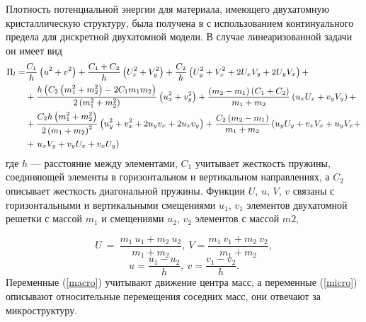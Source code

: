 Плотность потенциальной энергии для материала, имеющего двухатомную кристаллическую структуру, была получена в \cite{bound_porsp17} с использованием континуального предела для дискретной двухатомной модели. В случае линеаризованной задачи он имеет вид
\begin{equation}
\begin{small} 
	\begin{aligned}
		\Pi_l = & \frac{C_1}{h} \left(u^2 + v^2\right) + \frac{C_1+C_2}{h}\left(U_x^2+V_y^2\right) +\frac{C_2}{h}\left(U_y^2 + V_x^2 + 2U_x V_y + 2 U_y V_x\right) + \\ 
		& + \frac{h\left(C_2\left(m_1^2 + m_2^2\right) - 2C_1 m_1 m_2\right)}{2\left(m_1^2 + m_2^2\right)}\left(u_x^2 + v_y^2\right) + \frac{\left(m_2-m_1\right)\left(C_1+C_2\right)}{m_1+m_2}\left(u_x U_x + v_y V_y\right) + \\ 
		& + \frac{C_2 h\left(m_1^2+m_2^2\right)}{2\left(m_1+m_2\right)^2}\left(u_y^2+v_x^2+2u_y v_x + 2u_x v_y\right) + \frac{C_2\left(m_2 - m_1\right)}{m_1 + m_2}\left(u_y U_y+v_x V_x + u_y V_x + \right. \\
		& + \left. u_x V_y + v_y U_x + v_x U_y\right)
	\end{aligned}
\end{small}
\end{equation}
где $h$ --- расстояние между элементами, $C_1$ учитывает жесткость пружины, соединяющей элементы в горизонтальном и вертикальном направлениях, а $C_2$ описывает жесткость диагональной пружины. Функции $U$, $u$, $V$, $v$ связаны с горизонтальными и вертикальными смещениями $u_1$, $v_1$ элементов двухатомной решетки с массой $m_1$ и смещениями $u_2$, $v_2$ элементов с массой $m2$,

\begin{equation}
	U~=~\frac{m_1~u_1+m_2~u_2}{m_1+m_2},~V=\frac{m_1~v_1+m_2~v_2}{m_1+m_2}, \label{macro}
\end{equation}
\begin{equation}
	u=\frac{u_1-u_2}{h},~v=\frac{v_1-v_2}{h}. \label{micro}
\end{equation}
Переменные (\ref{macro}) учитывают движение центра масс, а переменные (\ref{micro}) описывают относительные перемещения соседних масс, они отвечают за микроструктуру.

